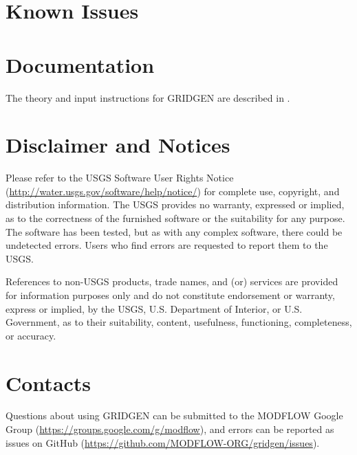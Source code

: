 \documentclass[11pt,twoside,twocolumn]{usgsreport}
\begin{document}
\section{Known Issues}



\section{Documentation}

The theory and input instructions for GRIDGEN are described in \citet{lien2015gridgen}.

\section{Disclaimer and Notices}

Please refer to the USGS Software User Rights Notice (\url{http://water.usgs.gov/software/help/notice/}) for complete use, copyright, and distribution information. The USGS provides no warranty, expressed or implied, as to the correctness of the furnished software or the suitability for any purpose. The software has been tested, but as with any complex software, there could be undetected errors. Users who find errors are requested to report them to the USGS.

References to non-USGS products, trade names, and (or) services are provided for information purposes only and do not constitute endorsement or warranty, express or implied, by the USGS, U.S. Department of Interior, or U.S. Government, as to their suitability, content, usefulness, functioning, completeness, or accuracy.

\section{Contacts}

Questions about using GRIDGEN can be submitted to the MODFLOW Google Group (\url{https://groups.google.com/g/modflow}), and errors can be reported as issues on GitHub (\url{https://github.com/MODFLOW-ORG/gridgen/issues}).


\REFSECTION


\end{document}
